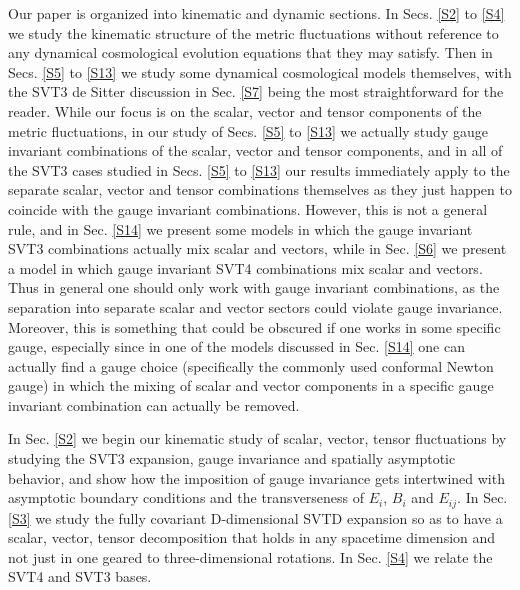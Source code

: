 \documentclass[aps,onecolumn,10pt]{revtex4}
\numberwithin{equation}{section}
\numberwithin{equation}{section}
\begin{document}
Our paper is organized into kinematic and dynamic sections. In Secs. \ref{S2} to \ref{S4} we study the kinematic structure of the metric fluctuations without reference to any dynamical cosmological evolution equations that they may satisfy. Then in Secs. \ref{S5} to \ref{S13} we study some dynamical cosmological models themselves, with the SVT3 de Sitter discussion in Sec. \ref{S7} being the most straightforward for the reader. While our focus is on the scalar, vector and  tensor components of the metric fluctuations, in our study of Secs. \ref{S5} to \ref{S13} we actually study gauge invariant combinations of the scalar, vector and tensor components, and in all of the SVT3 cases studied in Secs. \ref{S5} to \ref{S13} our results immediately apply to the separate scalar, vector and tensor combinations themselves as they just happen to coincide with the gauge invariant combinations. However, this is not a general rule, and in Sec. \ref{S14} we present some models in which the gauge invariant SVT3 combinations actually mix scalar and vectors, while in Sec. \ref{S6} we present a model in which gauge invariant SVT4 combinations mix scalar and vectors. Thus in general one should only work with gauge invariant combinations, as the separation into separate scalar and vector sectors could violate gauge invariance. Moreover, this is something that could be obscured if one works in some specific gauge, especially since in one of the models discussed in Sec. \ref{S14} one can actually find a gauge choice (specifically the commonly used conformal Newton gauge) in which the mixing of scalar and vector components in a specific gauge invariant combination can actually be removed. 


In Sec. \ref{S2} we begin our kinematic study of scalar, vector, tensor fluctuations by studying the SVT3 expansion, gauge invariance and spatially asymptotic behavior, and show how the imposition of gauge invariance gets intertwined with asymptotic  boundary conditions and the transverseness of $E_i$, $B_i$ and $E_{ij}$. In Sec. \ref{S3} we study the fully covariant D-dimensional SVTD expansion so as to have a scalar, vector, tensor decomposition that holds in any spacetime dimension and not just in one geared to three-dimensional rotations. In Sec. \ref{S4} we relate the SVT4 and SVT3 bases. 
\end{document}
